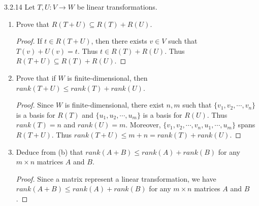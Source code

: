 \documentclass[12pt, a4paper]{article}
\theoremstyle{plain}
\begin{document}
\begin{exercise}{3.2.14}
Let $T,U:V\rightarrow W$ be linear transformations.
\begin{enumerate}[label=(\alph*)]
\item Prove that $R(T+U)\subseteq R(T)+R(U)$.
	\begin{proof}
	If $t\in R(T+U)$, then there exists $v\in V$ such that $T(v)+U(v)=t$. Thus $t\in R(T)+R(U)$. Thus $R(T+U)\subseteq R(T)+R(U)$.
	\end{proof}
\item Prove that if $W$ is finite-dimensional, then $rank(T+U)\leq rank(T)+rank(U)$.
	\begin{proof}
	Since $W$ is finite-dimensional, there exist $n,m$ such that $\{v_1,v_2,\cdots ,v_n\}$ is a basis for $R(T)$ and $\{u_1,u_2,\cdots ,u_m\}$ is a basis for $R(U)$. Thus $rank(T)=n$ and $rank(U)=m$. Moreover, $\{v_1,v_2,\cdots ,v_n,u_1,\cdots ,u_m\}$ spans $R(T+U)$. Thus $rank(T+U)\leq m+n = rank(T)+rank(U)$.
	\end{proof}
\item Deduce from (b) that $rank(A+B)\leq rank(A)+rank(B)$ for any $m\times n$ matrices $A$ and $B$.
	\begin{proof}
	Since a matrix represent a linear transformation, we have $rank(A+B)\leq rank(A)+rank(B)$ for any $m\times n$ matrices $A$ and $B$.
	\end{proof}
\end{enumerate}
\end{exercise}
\end{document}

